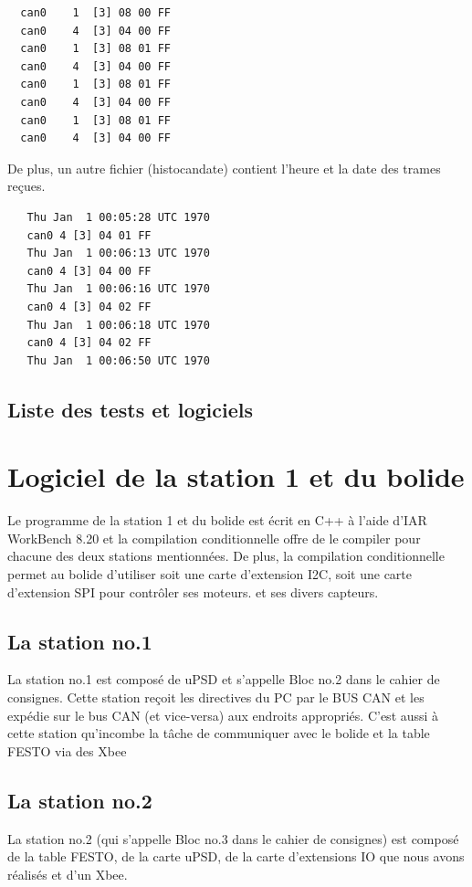 \documentclass[10pt,a4paper,final]{article}
\begin{document}
\begin{verbatim}
  can0    1  [3] 08 00 FF
  can0    4  [3] 04 00 FF
  can0    1  [3] 08 01 FF
  can0    4  [3] 04 00 FF
  can0    1  [3] 08 01 FF
  can0    4  [3] 04 00 FF
  can0    1  [3] 08 01 FF
  can0    4  [3] 04 00 FF
\end{verbatim}

De plus, un autre fichier (histocandate) contient l'heure et la date des trames reçues.
\begin{verbatim}
   Thu Jan  1 00:05:28 UTC 1970
   can0 4 [3] 04 01 FF
   Thu Jan  1 00:06:13 UTC 1970
   can0 4 [3] 04 00 FF
   Thu Jan  1 00:06:16 UTC 1970
   can0 4 [3] 04 02 FF
   Thu Jan  1 00:06:18 UTC 1970
   can0 4 [3] 04 02 FF
   Thu Jan  1 00:06:50 UTC 1970
\end{verbatim} 

\begin{spacing}{1.5}
\subsection{Liste des tests et logiciels}






\pagebreak
\section{Logiciel de la station 1 et du bolide}
Le programme de la station 1 et du bolide est écrit en C++ à l'aide d'IAR WorkBench 8.20 et la compilation conditionnelle offre de le compiler pour chacune des deux stations mentionnées. De plus, la compilation conditionnelle permet au bolide d'utiliser soit une carte d'extension I2C, soit une carte d'extension SPI pour contrôler ses moteurs. et ses divers capteurs.

\subsection{La station no.1}
La station no.1 est composé de uPSD et s'appelle Bloc no.2 dans le cahier de consignes. Cette station reçoit les directives du PC par le BUS CAN et les expédie sur le bus CAN (et vice-versa) aux endroits appropriés. C'est aussi à cette station qu'incombe la tâche de communiquer avec le bolide et la table FESTO via des Xbee

\subsection{La station no.2}
La station no.2 (qui s'appelle Bloc no.3 dans le cahier de consignes) est composé de la table FESTO, de la carte uPSD, de la carte d'extensions IO que nous avons réalisés et d'un Xbee.


\end{spacing}
\end{document}
